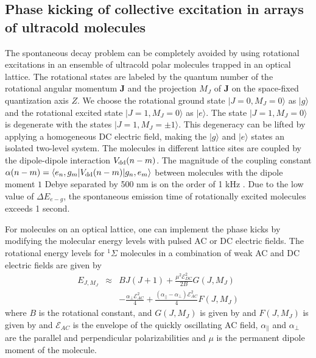 \subsection{Phase kicking of collective excitation in arrays of ultracold molecules}
\label{sec:phaseKickingMolecules}

The spontaneous decay problem can be completely avoided by using rotational excitations in an ensemble of
ultracold polar molecules trapped in an optical lattice.
The rotational states are labeled by the quantum
number of the rotational angular momentum $\bm{J}$ and the
projection $M_J$ of $\bm{J}$ on the space-fixed quantization axis
$Z$. We choose the rotational ground state $|J=0, M_J=0\rangle$ as
$|g\rangle$ and the rotational excited state $|J=1, M_J = 0
\rangle$ as $|e\rangle$. The state $|J=1, M_J = 0 \rangle$ is
degenerate with the states $|J=1, M_J = \pm 1 \rangle$. This
degeneracy can be lifted by applying a homogeneous DC electric
field, making the $|g\rangle$ and $|e\rangle$ states an isolated
two-level system. The molecules in different lattice sites are
coupled by the dipole-dipole interaction $V_{\rm dd}(n-m)$.
The magnitude of
the coupling constant $\alpha(n-m) = \langle e_{n} , g_{m} |
{V}_{\rm dd}(n-m) | g_{n}, e_{m} \rangle$ between molecules with
the dipole moment $1$ Debye separated by 500 nm is on the order of
1 kHz \cite{felipe}. Due to the low value of $\Delta E_{e-g}$, the spontaneous emission time of
rotationally excited molecules  exceeds 1 second.


For molecules on an optical lattice, one can implement the phase
kicks by modifying the molecular energy levels with pulsed AC or
DC electric fields. The rotational energy levels for $^1\Sigma$
molecules in a combination of weak AC and DC electric fields are
given by \cite{friedrich-95}
\begin{eqnarray}
E_{J,M_J}  &\approx&  BJ(J+1) +  \frac{\mu^2 \mathcal{E}_{DC}^2
}{2B} G(J,M_J) \nonumber \\
&& - \frac{ \alpha_{\perp}\mathcal{E}_{AC}^2 }{4} + \frac{
(\alpha_{||}-\alpha_{\perp})\mathcal{E}_{AC}^2 }{4}F(J,M_J)
 \label{DressedEnery-Sum}
\end{eqnarray}
%
where $B$ is the rotational constant,  and $G(J, M_J)$ is given by
and $F(J, M_J)$ is given by
and $\mathcal{E}_{AC}$ is the
envelope of the quickly oscillating AC field, $\alpha_\|$ and
$\alpha_{\perp}$ are the parallel and perpendicular
polarizabilities and $\mu$ is the permanent dipole moment of the
molecule.

